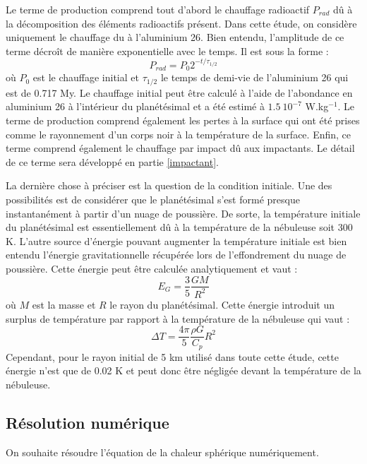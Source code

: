 \documentclass[10pt,a4paper]{article}
\numberwithin{equation}{section}
\begin{document}
Le terme de production comprend tout d'abord le chauffage radioactif $P_{rad}$ dû à la décomposition des éléments radioactifs présent. Dans cette étude, on considère uniquement le chauffage du à l'aluminium 26. Bien entendu, l'amplitude de ce terme décroît de manière exponentielle avec le temps. Il est sous la forme :
\begin{equation}
P_{rad} = P_{0}2^{-t/\tau_{1/2}}
\end{equation}
où $P_{0}$ est le chauffage initial et $\tau_{1/2}$ le temps de demi-vie de l'aluminium 26 qui est de 0.717 My. Le chauffage initial peut être calculé à l'aide de l'abondance en aluminium 26 à l'intérieur du planétésimal et a été estimé à $1.5\ 10^{-7}$ W.kg$^{-1}$.
Le terme de production comprend également les pertes à la surface qui ont été prises comme le rayonnement d'un corps noir à la température de la surface.
Enfin, ce terme comprend également le chauffage par impact dû aux impactants. Le détail de ce terme sera développé en partie \ref{impactant}.
\medskip

La dernière chose à préciser est la question de la condition initiale. Une des possibilités est de considérer que le planétésimal s'est formé presque instantanément à partir d'un nuage de poussière. De sorte, la température initiale du planétésimal est essentiellement dû à la température de la nébuleuse soit 300 K. L'autre source d'énergie pouvant augmenter la température initiale est bien entendu l'énergie gravitationnelle récupérée lors de l'effondrement du nuage de poussière. Cette énergie peut être calculée analytiquement et vaut :
\begin{equation}
E_{G} = \frac{3}{5}\frac{GM}{R^2}
\end{equation}
où $M$ est la masse et $R$ le rayon du planétésimal. Cette énergie introduit un surplus de température par rapport à la température de la nébuleuse qui vaut :
\begin{equation}
\Delta T = \frac{4 \pi}{5}\frac{\rho G}{C_p}R^2
\end{equation}
Cependant, pour le rayon initial de 5 km utilisé dans toute cette étude, cette énergie n'est que de 0.02 K et peut donc être négligée devant la température de la nébuleuse.


\subsection{Résolution numérique}

On souhaite résoudre l'équation de la chaleur sphérique numériquement. 
\medskip
\end{document}
